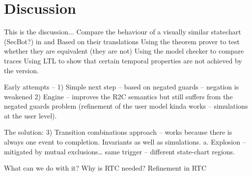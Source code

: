 
\section{Discussion}
\label{sec:discussion}

This is the discussion...
Compare the behaviour of a visually similar statechart (SecBot?) in \iUMLB and \SCXML 
	Based on their \EventB translations
	Using the theorem prover to test whether they are equivalent (they are not)
	Using the model checker to compare traces
	Using LTL to show that certain temporal properties are not achieved by the \iUMLB version.


Early attempts – 
1)	Simple next step – based on negated guards – negation is weakened
2)	Engine – improves the R2C semantics but still suffers from the negated guards problem (refinement of the user model kinda works – simulations at the user level).

The solution:
3)	Transition combinations approach – works because there is always one event to completion. Invariants as well as simulations. 
a.	Explosion – mitigated by mutual exclusions… same trigger – different state-chart regions.

What can we do with it? 
	Why is RTC needed?
	Refinement in RTC

